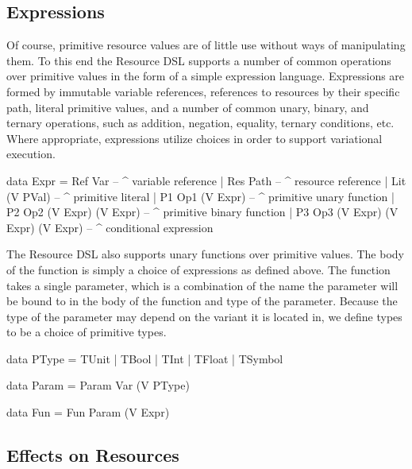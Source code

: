 \documentclass[letterpaper,10pt,onecolumn]{article}
\begin{document}
\subsection{Expressions}

Of course, primitive resource values are of little use without ways of manipulating them. To this end the Resource DSL supports
a number of common operations over primitive values in the form of a simple expression language. Expressions are formed by
immutable variable references, references to resources by their specific path, literal primitive values, and a number of common unary, binary, and ternary
operations, such as addition, negation, equality, ternary conditions, etc. Where appropriate, expressions utilize choices in order to support
variational execution.

\begin{program}
data Expr
     = Ref Var                             -- ^ variable reference
     | Res Path                            -- ^ resource reference
     | Lit (V PVal)                        -- ^ primitive literal
     | P1  Op1 (V Expr)                    -- ^ primitive unary function
     | P2  Op2 (V Expr) (V Expr)           -- ^ primitive binary function
     | P3 Op3 (V Expr) (V Expr) (V Expr) -- ^ conditional expression
\end{program}

The Resource DSL also supports unary functions over primitive values. The body of the function is simply a choice of expressions as defined above.
The function takes a single parameter, which is a combination of the name the parameter will be bound to in the body of the function and type of the parameter. Because the
type of the parameter may depend on the variant it is located in, we define types to be a choice of primitive types.

\begin{program}
data PType = TUnit | TBool | TInt | TFloat | TSymbol

data Param = Param Var (V PType)

data Fun = Fun Param (V Expr)
\end{program}

\subsection{Effects on Resources}
\end{document}
